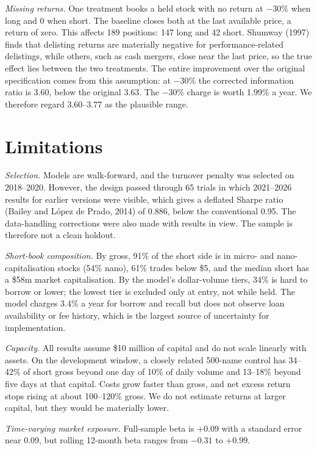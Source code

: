\documentclass[10pt,twocolumn,letterpaper]{article}
\begin{document}
\textit{Missing returns.} One treatment books a held stock with no return at $-30\%$ when long and 0 when short. The baseline closes both at the last available price, a return of zero. This affects 189 positions: 147 long and 42 short. Shumway (1997) finds that delisting returns are materially negative for performance-related delistings, while others, such as cash mergers, close near the last price, so the true effect lies between the two treatments. The entire improvement over the original specification comes from this assumption: at $-30\%$ the corrected information ratio is 3.60, below the original 3.63. The $-30\%$ charge is worth 1.99\% a year. We therefore regard 3.60--3.77 as the plausible range.

\section{Limitations}

\textit{Selection.} Models are walk-forward, and the turnover penalty was selected on 2018--2020. However, the design passed through 65 trials in which 2021--2026 results for earlier versions were visible, which gives a deflated Sharpe ratio (Bailey and L\'opez de Prado, 2014) of 0.886, below the conventional 0.95. The data-handling corrections were also made with results in view. The sample is therefore not a clean holdout.

\textit{Short-book composition.} By gross, 91\% of the short side is in micro- and nano-capitalisation stocks (54\% nano), 61\% trades below \$5, and the median short has a \$58m market capitalisation. By the model's dollar-volume tiers, 34\% is hard to borrow or lower; the lowest tier is excluded only at entry, not while held. The model charges 3.4\% a year for borrow and recall but does not observe loan availability or fee history, which is the largest source of uncertainty for implementation.

\textit{Capacity.} All results assume \$10 million of capital and do not scale linearly with assets. On the development window, a closely related 500-name control has 34--42\% of short gross beyond one day of 10\% of daily volume and 13--18\% beyond five days at that capital. Costs grow faster than gross, and net excess return stops rising at about 100--120\% gross. We do not estimate returns at larger capital, but they would be materially lower.

\textit{Time-varying market exposure.} Full-sample beta is $+0.09$ with a standard error near 0.09, but rolling 12-month beta ranges from $-0.31$ to $+0.99$.
\end{document}
